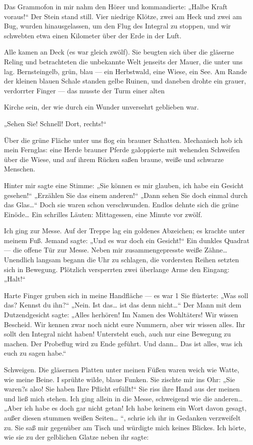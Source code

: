 Das Grammofon in mir nahm den Hörer und kommandierte: „Halbe Kraft
voraus!“ Der Stein stand still. Vier niedrige Klötze, zwei am Heck
und zwei am Bug, wurden hinausgelassen, um den Flug des Integral zu
stoppen, und wir schwebten etwa einen Kilometer über der Erde in
der Luft.

Alle kamen an Deck (es war gleich zwölf). Sie beugten sich über die
gläserne Reling und betrachteten die unbekannte Welt jenseits der
Mauer, die unter uns lag. Bernsteingelb, grün, blau — ein
Herbstwald, eine Wiese, ein See. Am Rande der kleinen blauen Schale
standen gelbe Ruinen, und daneben drohte ein grauer, verdorrter
Finger — das musste der Turm einer alten

Kirche sein, der wie durch ein Wunder unversehrt geblieben war.

„Sehen Sie! Schnell! Dort, rechts!“

Über die grüne Fläche unter uns flog ein brauner Schatten.
Mechanisch hob ich mein Fernglas: eine Herde brauner Pferde
galoppierte mit wehenden Schweifen über die Wiese, und auf ihrem
Rücken saßen braune, weiße und schwarze Menschen.

Hinter mir sagte eine Stimme: „Sie können es mir glauben, ich habe
ein Gesicht gesehen!“ „Erzählen Sie das einem anderen!“ „Dann sehen
Sie doch einmal durch das Glas\ldots{}“ Doch sie waren schon
verschwunden. Endlos dehnte sich die grüne Einöde\ldots{} Ein schrilles
Läuten: Mittagessen, eine Minute vor zwölf.

Ich ging zur Messe. Auf der Treppe lag ein goldenes Abzeichen; es
krachte unter meinem Fuß. Jemand sagte: „Und es war doch ein
Gesicht!“ Ein dunkles Quadrat — die offene Tür zur Messe. Neben mir
zusammengepresste weiße Zähne\ldots{} Unendlich langsam begann die Uhr
zu schlagen, die vordersten Reihen setzten sich in Bewegung.
Plötzlich versperrten zwei überlange Arme den Eingang: „Halt!“

Harte Finger gruben sich in meine Handfläche — es war 1 Sie
flüsterte: „Was soll das? Kennst du ihn?“ „Nein. Ist das\ldots{} ist das
denn nicht\ldots{}“ Der Mann mit dem Dutzendgesicht sagte: „Alles
herhören! Im Namen des Wohltäters! Wir wissen Bescheid. Wir kennen
zwar noch nicht eure Nummern, aber wir wissen alles. Ihr sollt den
Integral nicht haben! Untersteht euch, auch nur eine Bewegung zu
machen. Der Probeflug wird zu Ende geführt. Und dann\ldots{} Das ist
alles, was ich euch zu sagen habe.“

Schweigen. Die gläsernen Platten unter meinen Füßen waren weich wie
Watte, wie meine Beine. I sprühte wilde, blaue Funken. Sie zischte
mir ins Ohr: „Sie waren?s also! Sie haben Ihre
\glq{}Pflicht\grq{} erfüllt!“ Sie riss ihre Hand aus
der meinen und ließ mich stehen. Ich ging allein in die Messe,
schweigend wie die anderen\ldots{} „Aber ich habe es doch gar nicht
getan! Ich habe keinem ein Wort davon gesagt, außer diesen stummen
weißen Seiten\ldots{} “, schrie ich ihr in Gedanken verzweifelt zu. Sie
saß mir gegenüber am Tisch und würdigte mich keines Blickes. Ich
hörte, wie sie zu der gelblichen Glatze neben ihr sagte:

